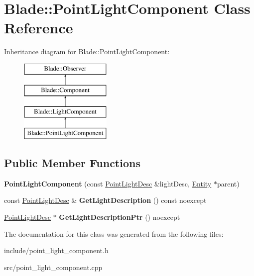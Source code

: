 \hypertarget{class_blade_1_1_point_light_component}{}\section{Blade\+:\+:Point\+Light\+Component Class Reference}
\label{class_blade_1_1_point_light_component}
Inheritance diagram for Blade\+:\+:Point\+Light\+Component\+:\begin{figure}[H]
\begin{center}
\leavevmode
\includegraphics[height=4.000000cm]{class_blade_1_1_point_light_component}
\end{center}
\end{figure}
\subsection*{Public Member Functions}
\begin{DoxyCompactItemize}
\item 
\mbox{\label{class_blade_1_1_point_light_component_afc983955082f9842299378143cc41498}} 
{\bfseries Point\+Light\+Component} (const \hyperlink{struct_blade_1_1_point_light_desc}{Point\+Light\+Desc} \&light\+Desc, \hyperlink{class_blade_1_1_entity}{Entity} $\ast$parent)
\item 
\mbox{\label{class_blade_1_1_point_light_component_ab3c163157873a1561f5f8f7b7dd377e5}} 
const \hyperlink{struct_blade_1_1_point_light_desc}{Point\+Light\+Desc} \& {\bfseries Get\+Light\+Description} () const noexcept
\item 
\mbox{\label{class_blade_1_1_point_light_component_acdfbc0b246f0b93cdb686105a2f2b46f}} 
\hyperlink{struct_blade_1_1_point_light_desc}{Point\+Light\+Desc} $\ast$ {\bfseries Get\+Light\+Description\+Ptr} () noexcept
\end{DoxyCompactItemize}


The documentation for this class was generated from the following files\+:\begin{DoxyCompactItemize}
\item 
include/point\+\_\+light\+\_\+component.\+h\item 
src/point\+\_\+light\+\_\+component.\+cpp\end{DoxyCompactItemize}
